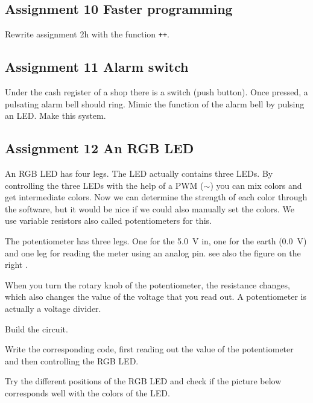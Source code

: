 \documentclass{arduino}
\begin{document}
\subsection{Assignment 10 Faster programming}

Rewrite assignment 2h with the function \lstinline{++}.

\subsection{Assignment 11 Alarm switch}

Under the cash register of a shop there is a switch (push button). Once pressed, a pulsating alarm bell should ring. Mimic the function of the alarm bell by pulsing an LED. Make this system.

\newpage
\subsection{Assignment 12 An RGB LED}


An RGB LED has four legs. The LED actually contains three LEDs. By controlling the three LEDs with the help of a PWM ($\sim$) you can mix colors and get intermediate colors. Now we can determine the strength of each color through the software, but it would be nice if we could also manually set the colors. We use variable resistors also called potentiometers for this.

The potentiometer has three legs. One for the \SI{5.0}{\volt} in, one for the earth (\SI{0.0}{\volt}) and one leg for reading the meter using an analog pin. see also the figure on the right .

When you turn the rotary knob of the potentiometer, the resistance changes, which also changes the value of the voltage that you read out. A potentiometer is actually a voltage divider.

\begin{alphalist}
\item Build the circuit.

\item Write the corresponding code, first reading out the value of the potentiometer and then controlling the RGB LED.

\item Try the different positions of the RGB LED and check if the picture below corresponds well with the colors of the LED.
\end{alphalist}
\end{document}
